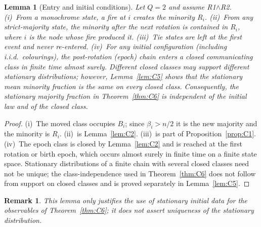 \documentclass[pdflatex,sn-mathphys-num]{sn-jnl}
\theoremstyle{thmstyleone}%
\newtheorem{lemma}[theorem]{Lemma}
\theoremstyle{thmstylethree}%
\theoremstyle{thmstyletwo}%
\newtheorem{remark}{Remark}[theorem]
\begin{document}
\begin{lemma}[Entry and initial conditions]
\label{lem:C0}
Let $Q=2$ and assume R1$\wedge$R2.
(i)~From a monochrome state, a fire at $i$ creates the minority $R_i$.
(ii)~From any strict-majority state, the minority after the next rotation
is contained in $R_i$, where $i$ is the node whose fire produced it.
(iii)~Tie states are left at the first event and never re-entered.
(iv)~For any initial configuration (including i.i.d.\ colourings), the
post-rotation (epoch) chain enters a closed communicating class in
finite time almost surely. Different closed classes may support different
stationary distributions; however, Lemma~\ref{lem:C5} shows that the
stationary mean minority fraction is the same on every closed class.
Consequently, the stationary majority fraction in Theorem~\ref{thm:C6}
is independent of the initial law and of the closed class.
\end{lemma}
\begin{proof}
(i)~The moved class occupies $B_i$; since $\beta_i>n/2$ it is the new
majority and the minority is $R_i$. (ii)~is Lemma~\ref{lem:C2}.
(iii)~is part of Proposition~\ref{prop:C1}. (iv)~The epoch class is closed
by Lemma~\ref{lem:C2} and is reached at the first rotation or birth
epoch, which occurs almost surely in finite time on a finite state space.
Stationary distributions of a finite chain with several closed classes
need not be unique; the class-independence used in Theorem~\ref{thm:C6}
does not follow from support on closed classes and is proved separately
in Lemma~\ref{lem:C5}.
\end{proof}
\begin{remark}
\label{rem:C0.1}
This lemma only justifies the use of stationary initial data for the
observables of Theorem~\ref{thm:C6}; it does not assert uniqueness of the
stationary distribution.
\end{remark}
\end{document}

